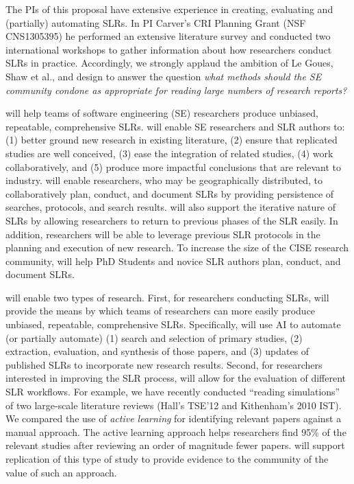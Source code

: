 The PIs of this proposal have extensive experience in creating, evaluating and (partially) automating SLRs.  
In PI Carver's CRI Planning Grant (NSF CNS1305395) he performed an extensive literature survey and conducted two international workshops to gather information about how researchers conduct SLRs in practice.
Accordingly, we strongly applaud the ambition of Le Goues, Shaw et al., and design {\IT} to answer the question {\em what methods should the SE community condone as appropriate for reading large numbers of research reports?} 

{\IT} will help teams of software engineering (SE) researchers produce unbiased, repeatable, comprehensive SLRs. 
{\IT} will enable SE researchers and SLR authors to: 
(1) better ground new research in existing literature, 
(2) ensure that replicated studies are well conceived, 
(3) ease the integration of related studies, 
(4) work collaboratively, and
(5) produce more impactful conclusions that are relevant to industry. 
{\IT} will enable researchers, who may be geographically distributed, to collaboratively plan, conduct, and document SLRs by providing persistence of searches, protocols, and search results. 
{\IT} will also support the iterative nature of SLRs by allowing researchers to return to previous phases of the SLR easily. 
In addition, researchers will be able to leverage previous SLR protocols in the planning and execution of new research. 
To increase the size of the CISE research community, {\IT} will help PhD Students and novice SLR authors plan, conduct, and document SLRs.


{\IT} will enable two types of research.
First, for researchers conducting SLRs, {\IT} will provide the means by which teams of researchers can more easily produce unbiased, repeatable, comprehensive SLRs. 
Specifically, {\IT} will use AI to automate (or partially automate) 
(1) search and selection of primary studies, 
(2) extraction, evaluation, and synthesis of those papers, and 
(3) updates of published SLRs to incorporate new research results.
Second, for researchers interested in improving the SLR process, {\IT} will allow for the evaluation of different SLR workflows.
For example, we have recently conducted ``reading simulations'' of two large-scale literature reviews (Hall's TSE'12 and  Kithenham's 2010 IST).
We compared the use of \textit{active learning} for identifying relevant papers against a manual approach.
The active learning approach helps researchers find 95\% of the relevant studies after reviewing an order of magnitude fewer papers. 
{\IT} will support replication of this type of study to provide evidence to the community of the value of such an approach.

